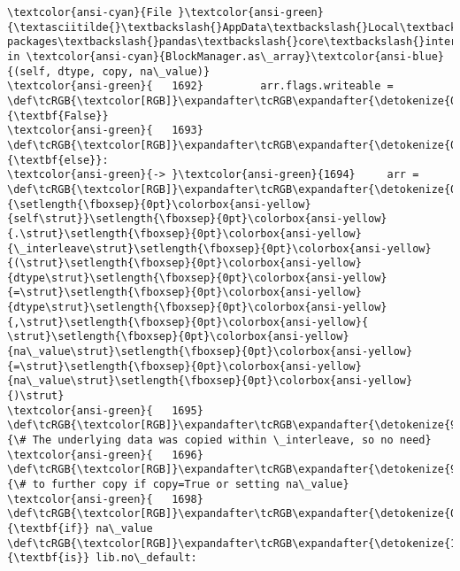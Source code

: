 \documentclass[11pt]{article}
\begin{document}
\begin{Verbatim}[commandchars=\\\{\}, frame=single, framerule=2mm, rulecolor=\color{outerrorbackground}]
\textcolor{ansi-cyan}{File }\textcolor{ansi-green}{\textasciitilde{}\textbackslash{}AppData\textbackslash{}Local\textbackslash{}Programs\textbackslash{}Python\textbackslash{}Python313\textbackslash{}Lib\textbackslash{}site-packages\textbackslash{}pandas\textbackslash{}core\textbackslash{}internals\textbackslash{}managers.py:1694}, in \textcolor{ansi-cyan}{BlockManager.as\_array}\textcolor{ansi-blue}{(self, dtype, copy, na\_value)}
\textcolor{ansi-green}{   1692}         arr.flags.writeable = \def\tcRGB{\textcolor[RGB]}\expandafter\tcRGB\expandafter{\detokenize{0,135,0}}{\textbf{False}}
\textcolor{ansi-green}{   1693} \def\tcRGB{\textcolor[RGB]}\expandafter\tcRGB\expandafter{\detokenize{0,135,0}}{\textbf{else}}:
\textcolor{ansi-green}{-> }\textcolor{ansi-green}{1694}     arr = \def\tcRGB{\textcolor[RGB]}\expandafter\tcRGB\expandafter{\detokenize{0,135,0}}{\setlength{\fboxsep}{0pt}\colorbox{ansi-yellow}{self\strut}}\setlength{\fboxsep}{0pt}\colorbox{ansi-yellow}{.\strut}\setlength{\fboxsep}{0pt}\colorbox{ansi-yellow}{\_interleave\strut}\setlength{\fboxsep}{0pt}\colorbox{ansi-yellow}{(\strut}\setlength{\fboxsep}{0pt}\colorbox{ansi-yellow}{dtype\strut}\setlength{\fboxsep}{0pt}\colorbox{ansi-yellow}{=\strut}\setlength{\fboxsep}{0pt}\colorbox{ansi-yellow}{dtype\strut}\setlength{\fboxsep}{0pt}\colorbox{ansi-yellow}{,\strut}\setlength{\fboxsep}{0pt}\colorbox{ansi-yellow}{ \strut}\setlength{\fboxsep}{0pt}\colorbox{ansi-yellow}{na\_value\strut}\setlength{\fboxsep}{0pt}\colorbox{ansi-yellow}{=\strut}\setlength{\fboxsep}{0pt}\colorbox{ansi-yellow}{na\_value\strut}\setlength{\fboxsep}{0pt}\colorbox{ansi-yellow}{)\strut}
\textcolor{ansi-green}{   1695}     \def\tcRGB{\textcolor[RGB]}\expandafter\tcRGB\expandafter{\detokenize{95,135,135}}{\# The underlying data was copied within \_interleave, so no need}
\textcolor{ansi-green}{   1696}     \def\tcRGB{\textcolor[RGB]}\expandafter\tcRGB\expandafter{\detokenize{95,135,135}}{\# to further copy if copy=True or setting na\_value}
\textcolor{ansi-green}{   1698} \def\tcRGB{\textcolor[RGB]}\expandafter\tcRGB\expandafter{\detokenize{0,135,0}}{\textbf{if}} na\_value \def\tcRGB{\textcolor[RGB]}\expandafter\tcRGB\expandafter{\detokenize{175,0,255}}{\textbf{is}} lib.no\_default:


\end{Verbatim}
\end{document}
